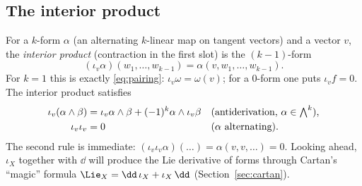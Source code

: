 \subsection{The interior product}\label{sec:interior}

For a $k$-form $\alpha$ (an alternating $k$-linear map on tangent vectors) and a vector $v$, the \emph{interior product} (contraction in the first slot) is the $(k-1)$-form
\begin{equation}\label{eq:interior}
(\iota_v\alpha)(w_1,\dots,w_{k-1})=\alpha(v,w_1,\dots,w_{k-1}).
\end{equation}
For $k=1$ this is exactly \eqref{eq:pairing}: $\iota_v\omega=\omega(v)$; for a $0$-form one puts $\iota_vf=0$.
The interior product satisfies
\begin{align}
\iota_v(\alpha\wedge\beta)&=\iota_v\alpha\wedge\beta+(-1)^k\alpha\wedge\iota_v\beta &&\text{(antiderivation, $\alpha\in\textstyle\bigwedge^k$),}\label{eq:antider}\\
\iota_v\iota_v&=0 &&\text{($\alpha$ alternating).}\notag
\end{align}
The second rule is immediate: $(\iota_v\iota_v\alpha)(\dots)=\alpha(v,v,\dots)=0$. Looking ahead, $\iota_X$ together with $\dd$ will
produce the Lie derivative of forms through Cartan's ``magic'' formula $\Lie_X=\dd\,\iota_X+\iota_X\,\dd$ (Section~\ref{sec:cartan}).

